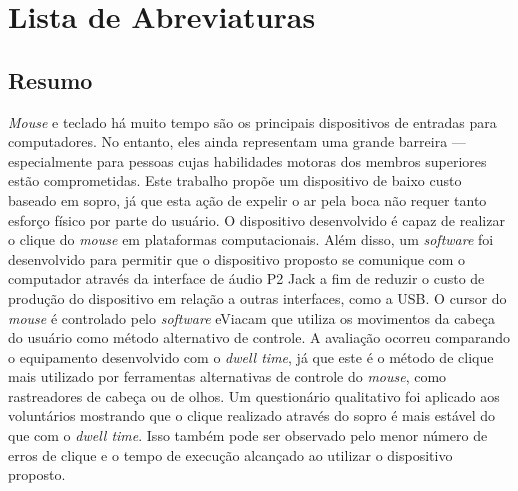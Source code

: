 \documentclass{ufpatcc}
\begin{document}

\listoffigures 
{} 
\clearpage

\listoftables 
{} 
\clearpage

\chapter*{Lista de Abreviaturas} \label{sec:siglas}
 \label{sec:siglas} 
\clearpage




\begin{ufpaResumo}
\chapter*{Resumo}
\textit{Mouse} e teclado há muito tempo são os principais dispositivos de
entradas para computadores. No entanto, eles ainda representam uma grande
barreira --- especialmente para pessoas cujas habilidades motoras dos membros
superiores estão comprometidas. Este trabalho propõe um dispositivo de baixo
custo baseado em sopro, já que esta ação de expelir o ar pela boca não requer
tanto esforço físico por parte do usuário. O dispositivo desenvolvido é capaz de
realizar o clique do \textit{mouse} em plataformas computacionais. Além disso,
um \textit{software} foi desenvolvido para permitir que o dispositivo proposto
se comunique com o computador através da interface de áudio P2 Jack a fim de
reduzir o custo de produção do dispositivo em relação a outras interfaces, como
a USB. O cursor do \textit{mouse} é controlado pelo \textit{software} eViacam
que utiliza os movimentos da cabeça do usuário como método alternativo de
controle. A avaliação ocorreu comparando o equipamento desenvolvido com o
\textit{dwell time}, já que este é o método de clique mais utilizado por
ferramentas alternativas de controle do \textit{mouse}, como rastreadores de
cabeça ou de olhos. Um questionário qualitativo foi aplicado aos voluntários
mostrando que o clique realizado através do sopro é mais estável do que com o
\textit{dwell time}. Isso também pode ser observado pelo menor número de erros
de clique e o tempo de execução alcançado ao utilizar o dispositivo proposto.
\end{ufpaResumo}
\end{document}
